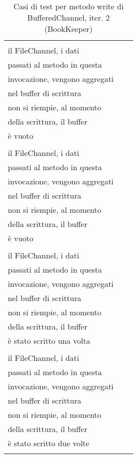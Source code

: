 \documentclass[10pt, a4paper]{article}
\newcommand{\Intmaketable}[4]{
	\begin{longtable}{#3}
	#4
	\caption{#2}
	\label{#1}
	\end{longtable}
}
\newcommand{\Inttestctable}[3]{
	\Intmaketable{#1}{#2}{|l|l|l|}{
	\hline
	\thead{Input} & \thead{Esito atteso} & \thead{Motivazione}\\
	\hline
	\hline
	#3
	\hline}
}
\newcommand{\Inttestccaption}[4]{Casi di test per metodo #1 di #2, iter. #3 (#4)}
\newcommand{\gettablelabel}[5]{table:#1:#2:#3:iter#4:proj#5}
\newcommand{\testctable}[5]{
	\Inttestctable{\gettablelabel{testc}{#1}{#2}{#3}{#4}}
		{\Inttestccaption{#1}{#2}{#3}{#4}}
		{#5}
}
\newcommand{\tcell}{\makecell[tl]}
\newcommand{\newtrow}{\\ \hline}
\def\bookkeeper{BookKeeper}
\begin{document}
	\testctable{write}{BufferedChannel}{2}{\bookkeeper}{
			\tcell{ByteBuf("")} & 
			\tcell{
				Nessuna interazione con\\
				il FileChannel, i dati\\
				passati al metodo in questa\\
				invocazione, vengono aggregati\\
				nel buffer di scrittura} & 	
			\tcell{
				Il buffer di scrittura\\
				non si riempie, al momento\\
				della scrittura, il buffer\\
				è vuoto}
		\newtrow
			\tcell{ByteBuf("random data")} &
			\tcell{
				Nessuna interazione con\\
				il FileChannel, i dati\\
				passati al metodo in questa\\
				invocazione, vengono aggregati\\
				nel buffer di scrittura} &
			\tcell{
				Il buffer di scrittura\\
				non si riempie, al momento\\
				della scrittura, il buffer\\
				è vuoto}
		\newtrow
			\tcell{ByteBuf("more random data")} &
			\tcell{
				Nessuna interazione con\\
				il FileChannel, i dati\\
				passati al metodo in questa\\
				invocazione, vengono aggregati\\
				nel buffer di scrittura} &
			\tcell{
				Il buffer di scrittura\\
				non si riempie, al momento\\
				della scrittura, il buffer\\
				è stato scritto una volta}
		\newtrow
			\tcell{ByteBuf("datadatadata")} &
			\tcell{
				Nessuna interazione con\\
				il FileChannel, i dati\\
				passati al metodo in questa\\
				invocazione, vengono aggregati\\
				nel buffer di scrittura} &
			\tcell{
				Il buffer di scrittura\\
				non si riempie, al momento\\
				della scrittura, il buffer\\
				è stato scritto due volte}
		\newtrow
			\tcell{ByteBuf("again random data")} &
}
\end{document}
